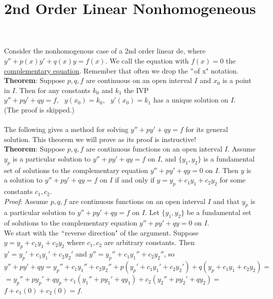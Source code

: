 \documentclass{ximera}
\begin{document}
\begin{abstract}
 \end{abstract}

    \title{2nd Order Linear Nonhomogeneous}
    
    \maketitle

 Consider the nonhomogenous case of a 2nd order linear de, where $y''+p(x)y'+q(x)y=f(x)$.  We call the equation with $f(x)=0$ the \underline{complementary equation}.   Remember that often we drop the $``$of x" notation. \\


 \textbf{Theorem}:   Suppose $p,q,f$ are continuous on an open interval $I$ and $x_{0}$ is a point in $I$.  Then for any constants $k_{0}$ and $k_{1}$ the IVP $y''+py'+qy=f,\mbox{ }y(x_{0})=k_{0},\mbox{ }y'(x_{0})=k_{1}$ has a unique solution on $I$.\\

 (The proof is skipped.)\\ \\


 The following gives a method for solving $y''+py'+qy=f$ for its general solution.   This theorem we will prove as its proof is instructive!\\


 \textbf{Theorem}:   Suppose $p,q,f$ are continuous functions on an open interval $I$.  Assume $y_{p}$ is a particular solution to $y''+py'+qy=f$ on $I$, and $\{y_{1},y_{2}\}$ is a fundamental set of solutions to the complementary equation $y''+py'+qy=0$ on $I$.  Then $y$ is a solution to  $y''+py'+qy=f$ on $I$ if and only if $y=y_{p}+c_{1}y_{1}+c_{2}y_{2}$ for some constants $c_{1},c_{2}$.\\


 \emph{Proof}:  Assume $p,q,f$ are continuous functions on an open interval $I$ and that $y_{p}$ is a particular solution to $y''+py'+qy=f$ on $I$. Let $\{y_1,y_2\}$ be a fundamental set of solutions to the complementary equation $y''+py'+qy=0$ on $I$.  \\

  We start with the $``$reverse direction" of the argument.  Suppose $y=y_{p}+c_{1}y_{1}+c_{2}y_{2}$ where $c_1,c_2$ are arbitrary constants.  Then $y'=y_{p}'+c_{1}y_{1}'+c_{2}y_{2}'$ and $y''=y_{p}''+c_{1}y_{1}''+c_{2}y_{2}''$, so \\ $y''+py'+qy=y_{p}''+c_{1}y_{1}''+c_{2}y_{2}''+p(y_{p}'+c_{1}y_{1}'+c_{2}y_{2}')+q(y_{p}+c_{1}y_{1}+c_{2}y_{2})=$ \\    $=y_{p}''+py_{p}'+qy_{p}+c_{1}(y_{1}''+py_{1}'+qy_{1})+c_{2}(y_{2}''+py_{2}'+qy_{2})=$ $f+c_1(0)+c_2(0)=f$.\\
\end{document}

